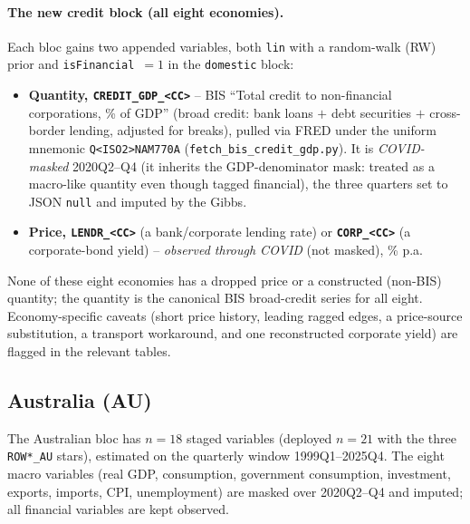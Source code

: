 \paragraph{The new credit block (all eight economies).} Each bloc gains two
appended variables, both \texttt{lin} with a random-walk (RW) prior and
\texttt{isFinancial}~$=1$ in the \texttt{domestic} block:
\begin{itemize}\itemsep1pt
  \item \textbf{Quantity, \texttt{CREDIT\_GDP\_<CC>}} -- BIS ``Total credit to
    non-financial corporations, \% of GDP'' (broad credit: bank loans $+$ debt
    securities $+$ cross-border lending, adjusted for breaks), pulled via FRED
    under the uniform mnemonic \texttt{Q<ISO2>NAM770A}
    (\texttt{fetch\_bis\_credit\_gdp.py}). It is \emph{COVID-masked}
    2020Q2--Q4 (it inherits the GDP-denominator mask: treated as a macro-like
    quantity even though tagged financial), the three quarters set to JSON
    \texttt{null} and imputed by the Gibbs.
  \item \textbf{Price, \texttt{LENDR\_<CC>}} (a bank/corporate lending rate) or
    \textbf{\texttt{CORP\_<CC>}} (a corporate-bond yield) -- \emph{observed
    through COVID} (not masked), \% p.a.
\end{itemize}
None of these eight economies has a dropped price or a constructed
(non-BIS) quantity; the quantity is the canonical BIS broad-credit series for
all eight. Economy-specific caveats (short price history, leading ragged edges,
a price-source substitution, a transport workaround, and one reconstructed
corporate yield) are flagged in the relevant tables.

\subsection{Australia (AU)}\label{sec:data:AU}

The Australian bloc has $n=18$ staged variables (deployed $n=21$ with the three
\texttt{ROW*\_AU} stars), estimated on the quarterly window 1999Q1--2025Q4.
The eight macro variables (real GDP, consumption, government consumption,
investment, exports, imports, CPI, unemployment) are masked over 2020Q2--Q4 and
imputed; all financial variables are kept observed.

